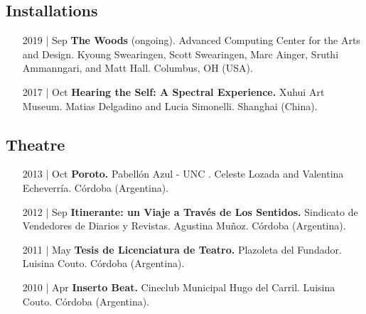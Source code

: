 \documentclass[12pt]{article}%
\begin{document}
\subsection{Installations}%
\begin{itemize}[align=parleft,leftmargin=2.25cm,labelwidth=2cm]
\item[2019 | Sep]
\textbf{The Woods}
(ongoing). 
Advanced Computing Center for the Arts and Design. 
Kyoung Swearingen, Scott Swearingen, Marc Ainger, Sruthi Ammanngari, and Matt Hall. 
Columbus, OH (USA). 
\end{itemize}%
\begin{itemize}[align=parleft,leftmargin=2.25cm,labelwidth=2cm]
\item[2017 | Oct]
\textbf{Hearing the Self: A Spectral Experience.}
Xuhui Art Museum. 
Matias Delgadino and Lucia Simonelli. 
Shanghai (China). 
\end{itemize}%
\subsection{Theatre}%
\begin{itemize}[align=parleft,leftmargin=2.25cm,labelwidth=2cm]
\item[2013 | Oct]
\textbf{Poroto.}
Pabellón Azul {-} UNC . 
Celeste Lozada and Valentina Echeverría. 
Córdoba (Argentina). 
\end{itemize}%
\begin{itemize}[align=parleft,leftmargin=2.25cm,labelwidth=2cm]
\item[2012 | Sep]
\textbf{Itinerante: un Viaje a Través de Los Sentidos.}
Sindicato de Vendedores de Diarios y Revistas. 
Agustina Muñoz. 
Córdoba (Argentina). 
\end{itemize}%
\begin{itemize}[align=parleft,leftmargin=2.25cm,labelwidth=2cm]
\item[2011 | May]
\textbf{Tesis de Licenciatura de Teatro.}
Plazoleta del Fundador. 
Luisina Couto. 
Córdoba (Argentina). 
\end{itemize}%
\begin{itemize}[align=parleft,leftmargin=2.25cm,labelwidth=2cm]
\item[2010 | Apr]
\textbf{Inserto Beat.}
Cineclub Municipal Hugo del Carril. 
Luisina Couto. 
Córdoba (Argentina). 
\end{itemize}%
\end{document}

